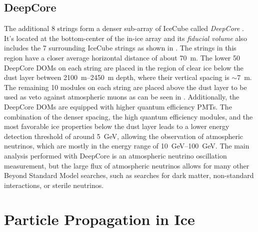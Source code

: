 

\subsection{DeepCore} 

The additional 8 strings form a denser sub-array of IceCube called \textit{DeepCore} . It's located at the bottom-center of the in-ice array and its \textit{fiducial volume} also includes the 7 surrounding IceCube strings as shown in . The strings in this region have a closer average horizontal distance of about \SI{70}{\meter}. The lower 50 DeepCore DOMs on each string are placed in the region of clear ice below the dust layer between \SIrange{2100}{2450}{\meter} depth, where their vertical spacing is $\sim$\SI{7}{\meter}. The remaining 10 modules on each string are placed above the dust layer to be used as veto against atmospheric muons as can be seen in . Additionally, the DeepCore DOMs are equipped with higher quantum efficiency PMTs. The combination of the denser spacing, the high quantum efficiency modules, and the most favorable ice properties below the dust layer leads to a lower energy detection threshold of around \SI{5}{GeV}, allowing the observation of atmospheric neutrinos, which are mostly in the energy range of \SIrange[range-phrase=-]{10}{100}{\giga\electronvolt}. The main analysis performed with DeepCore is an atmospheric neutrino oscillation measurement, but the large flux of atmospheric neutrinos allows for many other Beyond Standard Model searches, such as searches for dark matter, non-standard interactions, or sterile neutrinos. 


\section{Particle Propagation in Ice} 

